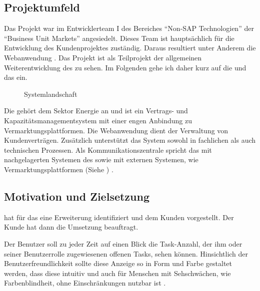 \begingroup
\setlength\intextsep{0pt}

\subsection{Projektumfeld} 
\label{sub:Projektumfeld}
Das Projekt war im Entwicklerteam I des Bereiches "`Non-SAP Technologien"' der "`Business Unit Markets"' angesiedelt.
Dieses Team ist hauptsächlich für die Entwicklung des Kundenprojektes  zuständig. Daraus resultiert unter
Anderem die Webanwendung . Das Projekt ist als Teilprojekt der allgemeinen Weiterentwicklung des
 zu sehen. Im Folgenden gehe ich daher kurz auf die  und das  ein.  

\begin{figure}
\caption{Systemlandschaft}
\label{app:Systemlandschaft} 
\end{figure}
Die  gehört dem Sektor Energie an und ist ein Vertrags- und Kapazitätsmanagementsystem mit einer engen
Anbindung zu Vermarktungsplattformen. Die Webanwendung  dient der Verwaltung von Kundenverträgen. Zusätzlich
unterstützt das System sowohl in fachlichen als auch technischen Prozessen. Als Kommunikationszentrale spricht das
 mit nachgelagerten Systemen des  sowie mit externen Systemen, wie \zB Vermarktungsplattformen
(Siehe ) \citep[vgl.][]{TSOBSS}.

\endgroup

\subsection{Motivation und Zielsetzung} 
\label{sub:Motivation und Zielsetzung}
 hat für das  eine Erweiterung identifiziert und dem Kunden vorgestellt. Der Kunde hat dann
die Umsetzung beauftragt.

Der Benutzer soll zu jeder Zeit auf einen Blick die Task-Anzahl, der ihm oder seiner Benutzerrolle zugewiesenen offenen Tasks,
sehen können. Hinsichtlich der Benutzerfreundlichkeit sollte diese Anzeige so in Form und Farbe gestaltet werden, dass
diese intuitiv und auch für Menschen mit Sehschwächen, wie Farbenblindheit, ohne Einschränkungen nutzbar ist \citep{Antrag}.


